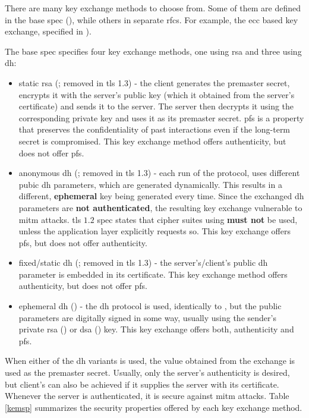 \documentclass{llncs}
\begin{document}
There are many key exchange methods to choose from. Some of them
are defined in the base spec (\cite{RFC5246}), while others
in separate \gls{rfc}s. For example, the \gls{ecc} based key exchange, specified
in  \cite{RFC4492}).

The base spec specifies four key exchange methods, one using \gls{rsa} and
three using \gls{dh}:

\begin{itemize}
  \item static \gls{rsa} (; removed in \gls{tls} 1.3) - the client generates the premaster secret, encrypts it with the
  server's public key (which it obtained from the server's  certificate) and
  sends it to the server. The server then decrypts it using the corresponding private key and uses it as its premaster secret. \gls{pfs} is
  a property that preserves the confidentiality of past interactions even if the
  long-term secret is compromised. This key exchange method offers authenticity, but does not offer \gls{pfs}.
  \item anonymous \gls{dh} (; removed in \gls{tls} 1.3) -
  each run of the protocol, uses
  different pubic \gls{dh} parameters, which are generated dynamically. This results
  in a different, \textbf{ephemeral} key being generated every time. Since the exchanged \gls{dh}
  parameters are \textbf{not authenticated}, the resulting key exchange
  vulnerable to \gls{mitm} attacks. \gls{tls} $1.2$ spec states that cipher suites
  using  \textbf{must not} be used, unless the application
  layer explicitly requests so. This key exchange offers \gls{pfs}, but does not offer
  authenticity.
  \item fixed/static \gls{dh} (; removed in \gls{tls} 1.3) - the server's/client's public \gls{dh} parameter
  is embedded in its certificate. This key exchange method offers authenticity,
  but does not offer \gls{pfs}.
  \item ephemeral \gls{dh} () - the \gls{dh} protocol is used, identically to , but the public parameters
  are digitally signed in some way, usually using the sender's private
  \gls{rsa} () or \gls{dsa} () key. This key
  exchange offers both, authenticity and \gls{pfs}.
\end{itemize}

When either of the \gls{dh} variants is used, the value obtained from the exchange is used
as the premaster secret. Usually, only the server's
authenticity is desired, but client's can also be achieved if it supplies the
server with its certificate. Whenever the server is authenticated, it is secure
against \gls{mitm} attacks. Table \ref{kemsp} summarizes the security properties
offered by each key exchange method.
\end{document}
